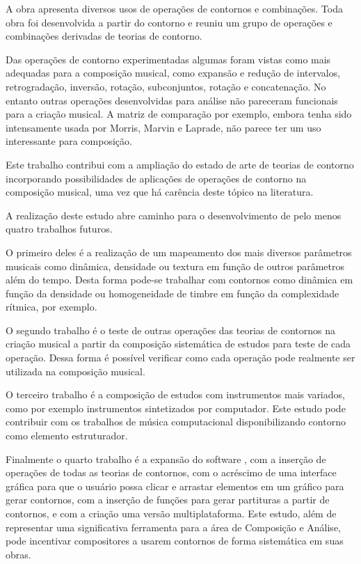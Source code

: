 A obra \obra{} apresenta diversos usos de operações de contornos e
combinações. Toda obra foi desenvolvida a partir do contorno \contpr{}
e reuniu um grupo de operações e combinações derivadas de teorias de
contorno. 

Das operações de contorno experimentadas algumas foram vistas como
mais adequadas para a composição musical, como expansão e redução de
intervalos, retrogradação, inversão, rotação, subconjuntos, rotação e
concatenação. No entanto outras operações desenvolvidas para análise
não pareceram funcionais para a criação musical. A matriz de
comparação por exemplo, embora tenha sido intensamente usada por
Morris, Marvin e Laprade, não parece ter um uso interessante para
composição.

Este trabalho contribui com a ampliação do estado de arte de teorias
de contorno incorporando possibilidades de aplicações de operações de
contorno na composição musical, uma vez que há carência deste tópico
na literatura.

A realização deste estudo abre caminho para o desenvolvimento de pelo
menos quatro trabalhos futuros.

O primeiro deles é a realização de um mapeamento dos mais diversos
parâmetros musicais como dinâmica, densidade ou textura em função de
outros parâmetros além do tempo. Desta forma pode-se trabalhar com
contornos como dinâmica em função da densidade ou homogeneidade de
timbre em função da complexidade rítmica, por exemplo.

O segundo trabalho é o teste de outras operações das teorias de
contornos na criação musical a partir da composição sistemática de
estudos para teste de cada operação. Dessa forma é possível verificar
como cada operação pode realmente ser utilizada na composição musical.

O terceiro trabalho é a composição de estudos com instrumentos mais
variados, como por exemplo instrumentos sintetizados por
computador. Este estudo pode contribuir com os trabalhos de música
computacional disponibilizando contorno como elemento estruturador.

Finalmente o quarto trabalho é a expansão do software \goiaba{}, com a
inserção de operações de todas as teorias de contornos, com o
acréscimo de uma interface gráfica para que o usuário possa clicar e
arrastar elementos em um gráfico para gerar contornos, com a inserção
de funções para gerar partituras a partir de contornos, e com a
criação uma versão multiplataforma. Este estudo, além de representar
uma significativa ferramenta para a área de Composição e Análise, pode
incentivar compositores a usarem contornos de forma sistemática em
suas obras.

